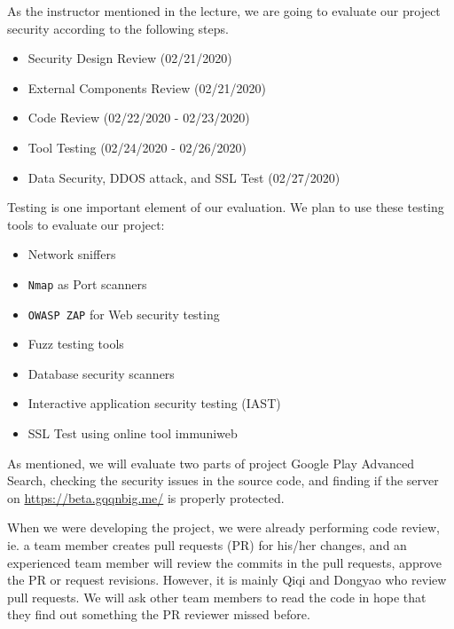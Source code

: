 \documentclass[12pt, a4paper]{article}
\newcommand{\code}[1]{\texttt{#1}}
\begin{document}
As the instructor mentioned in the lecture, we are going to evaluate our project security according to the following steps.

\begin{itemize}
    \item Security Design Review (02/21/2020)
    \item External Components Review (02/21/2020)
    \item Code Review (02/22/2020 - 02/23/2020)
    \item Tool Testing (02/24/2020 - 02/26/2020)
    \item Data Security, DDOS attack, and SSL Test (02/27/2020) 
\end{itemize}
    
Testing is one important element of our evaluation. We plan to use these testing tools to evaluate our project:
\begin{itemize}
    \item Network sniffers
    \item \code{Nmap} as Port scanners 
    \item \code{OWASP ZAP} for Web security testing
    \item Fuzz testing tools
    \item Database security scanners
    \item Interactive application security testing (IAST)
    \item SSL Test using online tool immuniweb
    
\end{itemize}


As mentioned, we will evaluate two parts of project Google Play Advanced Search, checking the security issues in the source code, and finding if the server on \url{https://beta.gqqnbig.me/} is properly protected.

When we were developing the project, we were already performing code review, ie. a team member creates pull requests (PR) for his/her changes, and an experienced team member will review the commits in the pull requests, approve the PR or request revisions. However, it is mainly Qiqi and Dongyao who review pull requests. We will ask other team members to read the code in hope that they find out something the PR reviewer missed before.
\end{document}
